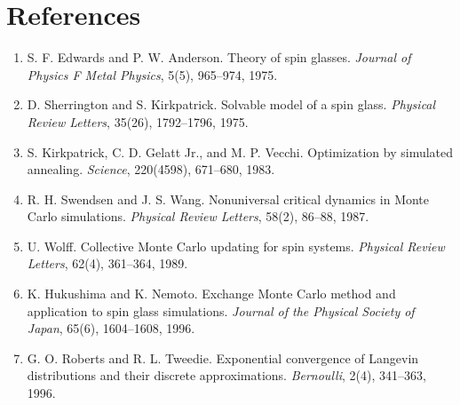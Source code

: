 \documentclass{article}
\begin{document}
\section{References}
\begin{enumerate}
    \item S. F. Edwards and P. W. Anderson. Theory of spin glasses. \textit{Journal of Physics F Metal Physics}, 5(5), 965--974, 1975.
    \item D. Sherrington and S. Kirkpatrick. Solvable model of a spin glass. \textit{Physical Review Letters}, 35(26), 1792--1796, 1975.
    \item S. Kirkpatrick, C. D. Gelatt Jr., and M. P. Vecchi. Optimization by simulated annealing. \textit{Science}, 220(4598), 671--680, 1983.
    \item R. H. Swendsen and J. S. Wang. Nonuniversal critical dynamics in Monte Carlo simulations. \textit{Physical Review Letters}, 58(2), 86--88, 1987.
    \item U. Wolff. Collective Monte Carlo updating for spin systems. \textit{Physical Review Letters}, 62(4), 361--364, 1989.
    \item K. Hukushima and K. Nemoto. Exchange Monte Carlo method and application to spin glass simulations. \textit{Journal of the Physical Society of Japan}, 65(6), 1604--1608, 1996.
    \item G. O. Roberts and R. L. Tweedie. Exponential convergence of Langevin distributions and their discrete approximations. \textit{Bernoulli}, 2(4), 341--363, 1996.
\end{enumerate}
\end{document}
